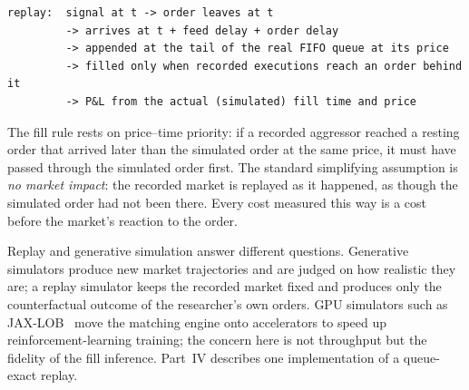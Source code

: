 \begin{lstlisting}
replay:  signal at t -> order leaves at t
         -> arrives at t + feed delay + order delay
         -> appended at the tail of the real FIFO queue at its price
         -> filled only when recorded executions reach an order behind it
         -> P&L from the actual (simulated) fill time and price
\end{lstlisting}

The fill rule rests on price--time priority: if a recorded aggressor reached a resting order that
arrived later than the simulated order at the same price, it must have passed through the
simulated order first. The standard simplifying assumption is \emph{no market impact}: the
recorded market is replayed as it happened, as though the simulated order had not been there. Every
cost measured this way is a cost before the market's reaction to the order.

Replay and generative simulation answer different questions. Generative simulators produce new
market trajectories and are judged on how realistic they are; a replay simulator keeps the recorded
market fixed and produces only the counterfactual outcome of the researcher's own orders. GPU
simulators such as JAX-LOB~\citep{frey2023} move the matching engine onto accelerators to speed up
reinforcement-learning training; the concern here is not throughput but the fidelity of the fill
inference. Part~IV describes one implementation of a queue-exact replay.

